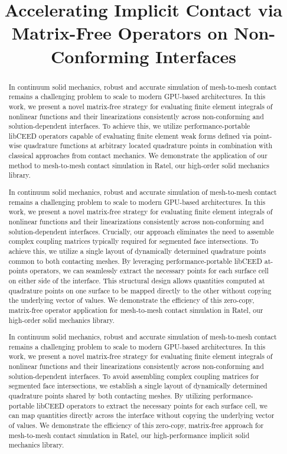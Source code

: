 \documentclass{article}
\title{Accelerating Implicit Contact via Matrix-Free Operators on Non-Conforming Interfaces}
\begin{document}
\maketitle
\begin{abstract}
    In continuum solid mechanics, robust and accurate simulation of mesh-to-mesh contact remains a challenging problem to scale to modern GPU-based architectures.
    In this work, we present a novel matrix-free strategy for evaluating finite element integrals of nonlinear functions and their linearizations consistently across non-conforming and solution-dependent interfaces.
    To achieve this, we utilize performance-portable libCEED operators capable of evaluating finite element weak forms defined via point-wise quadrature functions at arbitrary located quadrature points in combination with classical approaches from contact mechanics.
    We demonstrate the application of our method to mesh-to-mesh contact simulation in Ratel, our high-order solid mechanics library.

    In continuum solid mechanics, robust and accurate simulation of mesh-to-mesh contact remains a challenging problem to scale to modern GPU-based architectures.
    In this work, we present a novel matrix-free strategy for evaluating finite element integrals of nonlinear functions and their linearizations consistently across non-conforming and solution-dependent interfaces. 
    Crucially, our approach eliminates the need to assemble complex coupling matrices typically required for segmented face intersections. 
    To achieve this, we utilize a single layout of dynamically determined quadrature points common to both contacting meshes. 
    By leveraging performance-portable libCEED at-points operators, we can seamlessly extract the necessary points for each surface cell on either side of the interface. 
    This structural design allows quantities computed at quadrature points on one surface to be mapped directly to the other without copying the underlying vector of values. 
    We demonstrate the efficiency of this zero-copy, matrix-free operator application for mesh-to-mesh contact simulation in Ratel, our high-order solid mechanics library.

    In continuum solid mechanics, robust and accurate simulation of mesh-to-mesh contact remains a challenging problem to scale to modern GPU-based architectures. In this work, we present a novel matrix-free strategy for evaluating finite element integrals of nonlinear functions and their linearizations consistently across non-conforming and solution-dependent interfaces. To avoid assembling complex coupling matrices for segmented face intersections, we establish a single layout of dynamically determined quadrature points shared by both contacting meshes. By utilizing performance-portable libCEED operators to extract the necessary points for each surface cell, we can map quantities directly across the interface without copying the underlying vector of values. We demonstrate the efficiency of this zero-copy, matrix-free approach for mesh-to-mesh contact simulation in Ratel, our high-performance implicit solid mechanics library.
\end{abstract}
\end{document}
